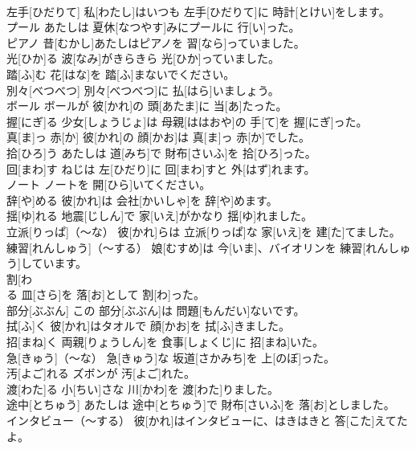 \documentclass[8pt]{extreport}
\begin{document}
\begin{CJK}{UTF8}{min}
\\	左手[ひだりて]	私[わたし]はいつも 左手[ひだりて]に 時計[とけい]をします。		
\\	プール	あたしは 夏休[なつやす]みにプールに 行[い]った。		
\\	ピアノ	昔[むかし]あたしはピアノを 習[なら]っていました。		
\\	光[ひか]る	波[なみ]がきらきら 光[ひか]っていました。		
\\	踏[ふ]む	花[はな]を 踏[ふ]まないでください。		
\\	別々[べつべつ]	別々[べつべつ]に 払[はら]いましょう。		
\\	ボール	ボールが 彼[かれ]の 頭[あたま]に 当[あ]たった。		
\\	握[にぎ]る	少女[しょうじょ]は 母親[ははおや]の 手[て]を 握[にぎ]った。		
\\	真[ま]っ 赤[か]	彼[かれ]の 顔[かお]は 真[ま]っ 赤[か]でした。		
\\	拾[ひろ]う	あたしは 道[みち]で 財布[さいふ]を 拾[ひろ]った。		
\\	回[まわ]す	ねじは 左[ひだり]に 回[まわ]すと 外[はず]れます。		
\\	ノート	ノートを 開[ひら]いてください。		
\\	辞[や]める	彼[かれ]は 会社[かいしゃ]を 辞[や]めます。		
\\	揺[ゆ]れる	地震[じしん]で 家[いえ]がかなり 揺[ゆ]れました。		
\\	立派[りっぱ]（～な）	彼[かれ]らは 立派[りっぱ]な 家[いえ]を 建[た]てました。		
\\	練習[れんしゅう]（～する）	娘[むすめ]は 今[いま]、バイオリンを 練習[れんしゅう]しています。		
\\	割[わ
\\	る	皿[さら]を 落[お]として 割[わ]った。		
\\	部分[ぶぶん]	この 部分[ぶぶん]は 問題[もんだい]ないです。		
\\	拭[ふ]く	彼[かれ]はタオルで 顔[かお]を 拭[ふ]きました。		
\\	招[まね]く	両親[りょうしん]を 食事[しょくじ]に 招[まね]いた。		
\\	急[きゅう]（～な）	急[きゅう]な 坂道[さかみち]を 上[のぼ]った。		
\\	汚[よご]れる	ズボンが 汚[よご]れた。		
\\	渡[わた]る	小[ちい]さな 川[かわ]を 渡[わた]りました。		
\\	途中[とちゅう]	あたしは 途中[とちゅう]で 財布[さいふ]を 落[お]としました。		
\\	インタビュー（～する）	彼[かれ]はインタビューに、はきはきと 答[こた]えてたよ。		

\end{CJK}
\end{document}
